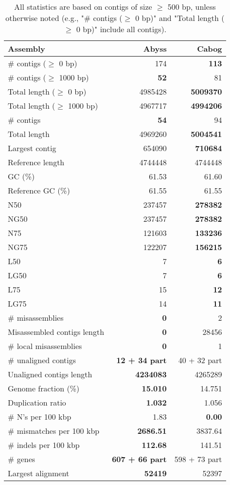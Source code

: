 \documentclass[12pt,a4paper]{article}
\begin{document}
\begin{table}[ht]
\begin{center}
\caption{All statistics are based on contigs of size $\geq$ 500 bp, unless otherwise noted (e.g., "\# contigs ($\geq$ 0 bp)" and "Total length ($\geq$ 0 bp)" include all contigs).}
\begin{tabular}{|l*{2}{|r}|}
\hline
Assembly & Abyss & Cabog \\ \hline
\# contigs ($\geq$ 0 bp) & 174 & {\bf 113} \\ \hline
\# contigs ($\geq$ 1000 bp) & {\bf 52} & 81 \\ \hline
Total length ($\geq$ 0 bp) & 4985428 & {\bf 5009370} \\ \hline
Total length ($\geq$ 1000 bp) & 4967717 & {\bf 4994206} \\ \hline
\# contigs & {\bf 54} & 94 \\ \hline
Total length & 4969260 & {\bf 5004541} \\ \hline
Largest contig & 654090 & {\bf 710684} \\ \hline
Reference length & 4744448 & 4744448 \\ \hline
GC (\%) & 61.53 & 61.60 \\ \hline
Reference GC (\%) & 61.55 & 61.55 \\ \hline
N50 & 237457 & {\bf 278382} \\ \hline
NG50 & 237457 & {\bf 278382} \\ \hline
N75 & 121603 & {\bf 133236} \\ \hline
NG75 & 122207 & {\bf 156215} \\ \hline
L50 & 7 & {\bf 6} \\ \hline
LG50 & 7 & {\bf 6} \\ \hline
L75 & 15 & {\bf 12} \\ \hline
LG75 & 14 & {\bf 11} \\ \hline
\# misassemblies & {\bf 0} & 2 \\ \hline
Misassembled contigs length & {\bf 0} & 28456 \\ \hline
\# local misassemblies & {\bf 0} & 1 \\ \hline
\# unaligned contigs & {\bf 12 + 34 part} & 40 + 32 part \\ \hline
Unaligned contigs length & {\bf 4234083} & 4265289 \\ \hline
Genome fraction (\%) & {\bf 15.010} & 14.751 \\ \hline
Duplication ratio & {\bf 1.032} & 1.056 \\ \hline
\# N's per 100 kbp & 1.83 & {\bf 0.00} \\ \hline
\# mismatches per 100 kbp & {\bf 2686.51} & 3837.64 \\ \hline
\# indels per 100 kbp & {\bf 112.68} & 141.51 \\ \hline
\# genes & {\bf 607 + 66 part} & 598 + 73 part \\ \hline
Largest alignment & {\bf 52419} & 52397 \\ \hline
\end{tabular}
\end{center}
\end{table}
\end{document}
